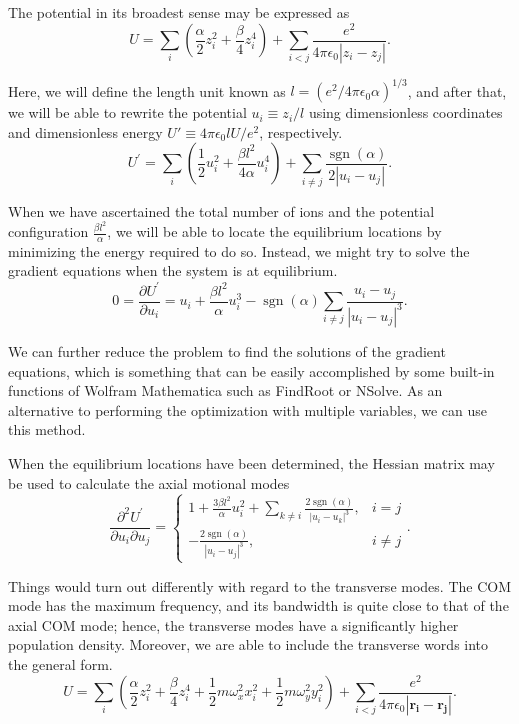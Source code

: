 The potential in its broadest sense may be expressed as
\begin{equation}
    U=\sum_i\left(\frac{\alpha}{2} z_i^2+\frac{\beta}{4} z_i^4\right)+\sum_{i<j} \frac{e^2}{4 \pi \epsilon_0\left|z_i-z_j\right|}.
\end{equation}

Here, we will define the length unit known as $l=\left(e^2 / 4 \pi \epsilon_0 \alpha\right)^{1 / 3}$, and after that, we will be able to rewrite the potential \(u_i\equiv z_i/l\) using dimensionless coordinates and dimensionless energy \(U'\equiv 4\pi \epsilon_0 lU/e^2\), respectively.
\begin{equation}
    U^{\prime}=\sum_i\left(\frac{1}{2} u_i^2+\frac{\beta l^2}{4 \alpha} u_i^4\right)+\sum_{i \neq j} \frac{\operatorname{sgn}(\alpha)}{2\left|u_i-u_j\right|}.
\end{equation}

When we have ascertained the total number of ions and the potential configuration \(\frac{\beta l^2}{\alpha}\), we will be able to locate the equilibrium locations by minimizing the energy required to do so. Instead, we might try to solve the gradient equations when the system is at equilibrium.
\begin{equation}
    0=\frac{\partial U^{\prime}}{\partial u_i}=u_i+\frac{\beta l^2}{\alpha} u_i^3-\operatorname{sgn}(\alpha) \sum_{i \neq j} \frac{u_i-u_j}{\left|u_i-u_j\right|^3}.
\end{equation}

We can further reduce the problem to find the solutions of the gradient equations, which is something that can be easily accomplished by some built-in functions of Wolfram Mathematica such as FindRoot or NSolve. As an alternative to performing the optimization with multiple variables, we can use this method.

When the equilibrium locations have been determined, the Hessian matrix may be used to calculate the axial motional modes
\begin{equation}
    \frac{\partial^2 U^{\prime}}{\partial u_i \partial u_j}= \begin{cases}1+\frac{3 \beta l^2}{\alpha} u_i^2+\sum_{k \neq i} \frac{2 \operatorname{sgn}(\alpha)}{\left|u_i-u_k\right|^3}, & i=j \\ -\frac{2 \operatorname{sgn}(\alpha)}{\left|u_i-u_j\right|^3}, & i \neq j\end{cases}.
\end{equation}

Things would turn out differently with regard to the transverse modes. The COM mode has the maximum frequency, and its bandwidth is quite close to that of the axial COM mode; hence, the transverse modes have a significantly higher population density. Moreover, we are able to include the transverse words into the general form.
\begin{equation}
    U=\sum_i\left(\frac{\alpha}{2} z_i^2+\frac{\beta}{4} z_i^4+\frac{1}{2} m \omega_x^2 x_i^2+\frac{1}{2} m \omega_y^2 y_i^2\right)+\sum_{i<j} \frac{e^2}{4 \pi \epsilon_0\left|\mathbf{r}_{\mathbf{i}}-\mathbf{r}_{\mathbf{j}}\right|}.
\end{equation}

